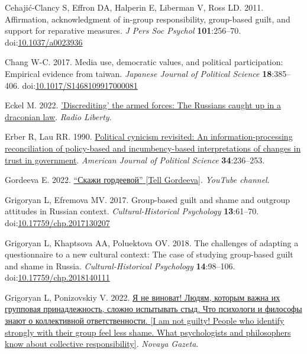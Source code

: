 \documentclass[
]{article}
\newlength{\cslhangindent}
\newenvironment{CSLReferences}[2] %
 {\begin{list}{}{%
  \setlength{\itemindent}{0pt}
  \setlength{\leftmargin}{0pt}
  \setlength{\parsep}{0pt}
  \ifodd #1
   \setlength{\leftmargin}{\cslhangindent}
   \setlength{\itemindent}{-1\cslhangindent}
  \fi
  \setlength{\itemsep}{#2\baselineskip}}}
 {\end{list}}
\begin{document}
\begin{CSLReferences}{1}{0}
Cehajić-Clancy S, Effron DA, Halperin E, Liberman V, Ross LD. 2011. Affirmation, acknowledgment of in-group responsibility, group-based guilt, and support for reparative measures. \emph{J Pers Soc Psychol} \textbf{101}:256--70. doi:\href{https://doi.org/10.1037/a0023936}{10.1037/a0023936}

Chang W-C. 2017. Media use, democratic values, and political participation: Empirical evidence from taiwan. \emph{Japanese Journal of Political Science} \textbf{18}:385--406. doi:\href{https://doi.org/10.1017/S1468109917000081}{10.1017/S1468109917000081}

Eckel M. 2022. \href{https://www.rferl.org/a/russia-ukraine-war-discrediting-armed-forces-law/31875273.html}{'Discrediting' the armed forces: The {Russians} caught up in a draconian law}. \emph{Radio Liberty}.

Erber R, Lau RR. 1990. \href{http://www.jstor.org/stable/2111517}{Political cynicism revisited: An information-processing reconciliation of policy-based and incumbency-based interpretations of changes in trust in government}. \emph{American Journal of Political Science} \textbf{34}:236--253.

Gordeeva E. 2022. \href{https://www.youtube.com/@skazhigordeevoy}{{``Скажи гордеевой''} {{[}Tell Gordeeva{]}}}. \emph{YouTube channel}.

Grigoryan L, Efremova MV. 2017. Group-based guilt and shame and outgroup attitudes in {Russian} context. \emph{Cultural-Historical Psychology} \textbf{13}:61--70. doi:\href{https://doi.org/10.17759/chp.2017130207}{10.17759/chp.2017130207}

Grigoryan L, Khaptsova AA, Poluektova OV. 2018. The challenges of adapting a questionnaire to a new cultural context: The case of studying group-based guilt and shame in {Russia}. \emph{Cultural-Historical Psychology} \textbf{14}:98--106. doi:\href{https://doi.org/10.17759/chp.2018140111}{10.17759/chp.2018140111}

Grigoryan L, Ponizovskiy V. 2022. \href{https://novaya.media/articles/2022/08/16/ia-ne-vinovat}{Я не виноват! Людям, которым важна их групповая принадлежность, сложно испытывать стыд. Что психологи и философы знают о коллективной ответственности. {[}I am not guilty! People who identify strongly with their group feel less shame. What psychologists and philosophers know about collective responsibility{]}}. \emph{Novaya Gazeta}.


\end{CSLReferences}
\end{document}
